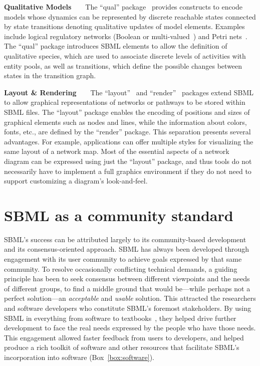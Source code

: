 \documentclass{sbml-paper}
\begin{document}
\textbf{Qualitative Models}~~~~The ``qual'' package~\citep{Chaouiya2015sbml} provides constructs to encode models whose dynamics can be represented by discrete reachable states connected by state transitions denoting qualitative updates of model elements. Examples include logical regulatory networks (Boolean or multi-valued~\citep{abou2016logical}) and Petri nets~\citep{chaouiya2007petri}. The ``qual'' package introduces SBML elements to allow the definition of qualitative species, which are used to associate discrete levels of activities with entity pools, as well as transitions, which define the possible changes between states in the transition graph.

\textbf{Layout \& Rendering}~~~~The ``layout''~\citep{Gauges2015} and ``render''~\citep{Bergmann2018sbml} packages extend SBML to allow graphical representations of networks or pathways to be stored within SBML files. The ``layout'' package enables the encoding of positions and sizes of graphical elements such as nodes and lines, while the information about colors, fonts, etc., are defined by the ``render'' package. This separation presents several advantages. For example, applications can offer multiple styles for visualizing the same layout of a network map. Most of the essential aspects of a network diagram can be expressed using just the ``layout'' package, and thus tools do not necessarily have to implement a full graphics environment if they do not need to support customizing a diagram's look-and-feel.

\hrulefill

\newpage
\section*{SBML as a community standard}

SBML's success can be attributed largely to its community-based development and its consensus-oriented approach. SBML has always been developed through engagement with its user community to achieve goals expressed by that same community. To resolve occasionally conflicting technical demands, a guiding principle has been to seek consensus between different viewpoints and the needs of different groups, to find a middle ground that would be---while perhaps not a perfect solution---an \emph{acceptable} and \emph{usable} solution. This attracted the researchers and software developers who constitute SBML's foremost stakeholders. By using SBML in everything from software to textbooks~\citep[e.g.,][]{Cesario2011cancer, Sullivan2012introduction, Wilkinson2018stochastic, Klipp2016systems, Liu2009systems, Choi2008introduction, Sauro2014systems}, they helped drive further development to face the real needs expressed by the people who have those needs.  This engagement allowed faster feedback from users to developers, and helped produce a rich toolkit of software and other resources that facilitate SBML's incorporation into software (Box~\ref{box:software}).
\end{document}
